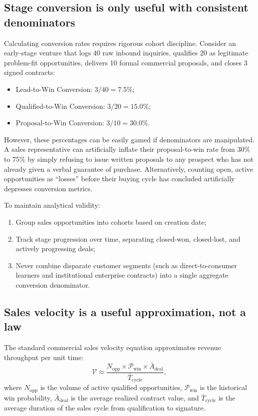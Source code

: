 \subsection{Stage conversion is only useful with consistent denominators}

Calculating conversion rates requires rigorous cohort discipline. Consider an early-stage venture that logs 40 raw inbound inquiries, qualifies 20 as legitimate problem-fit opportunities, delivers 10 formal commercial proposals, and closes 3 signed contracts:
\begin{itemize}
\item Lead-to-Win Conversion: $3 / 40 = 7.5\%$;
\item Qualified-to-Win Conversion: $3 / 20 = 15.0\%$;
\item Proposal-to-Win Conversion: $3 / 10 = 30.0\%$.
\end{itemize}
However, these percentages can be easily gamed if denominators are manipulated. A sales representative can artificially inflate their proposal-to-win rate from 30\% to 75\% by simply refusing to issue written proposals to any prospect who has not already given a verbal guarantee of purchase. Alternatively, counting open, active opportunities as ``losses'' before their buying cycle has concluded artificially depresses conversion metrics.

To maintain analytical validity:
\begin{enumerate}
\item Group sales opportunities into cohorts based on creation date;
\item Track stage progression over time, separating closed-won, closed-lost, and actively progressing deals;
\item Never combine disparate customer segments (such as direct-to-consumer learners and institutional enterprise contracts) into a single aggregate conversion denominator.
\end{enumerate}

\subsection{Sales velocity is a useful approximation, not a law}

The standard commercial sales velocity equation approximates revenue throughput per unit time:
\begin{equation}
\mathcal{V} \approx \frac{N_{\text{opp}} \times \mathcal{P}_{\text{win}} \times \bar{A}_{\text{deal}}}{\bar{T}_{\text{cycle}}},
\end{equation}
where $N_{\text{opp}}$ is the volume of active qualified opportunities, $\mathcal{P}_{\text{win}}$ is the historical win probability, $\bar{A}_{\text{deal}}$ is the average realized contract value, and $\bar{T}_{\text{cycle}}$ is the average duration of the sales cycle from qualification to signature.

